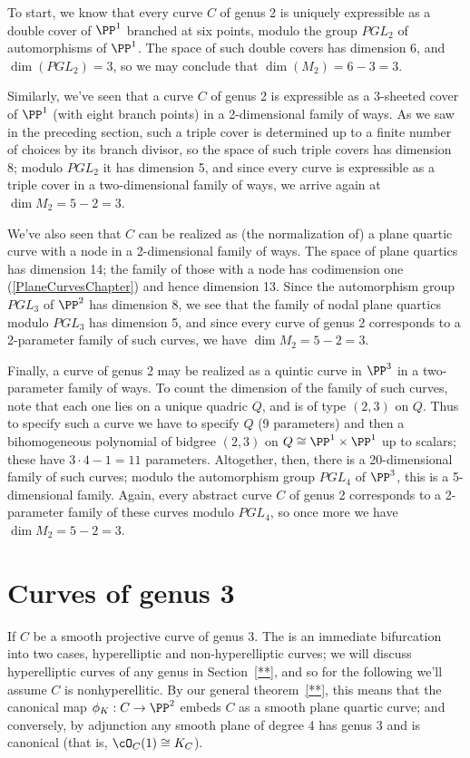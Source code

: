 To start, we know that every curve $C$ of genus 2 is uniquely expressible as a double cover of $\PP^1$ branched at six points, modulo the group $PGL_2$ of automorphisms of $\PP^1$. The space of such double covers has dimension 6, and $\dim(PGL_2) = 3$, so we may conclude that $\dim(M_2) = 6-3 = 3$.

Similarly, we've seen that a curve $C$ of genus 2 is expressible as a 3-sheeted cover of $\PP^1$ (with eight branch points) in a 2-dimensional family of ways. As we saw in the preceding section, such a triple cover is determined up to a finite number of choices by its branch divisor, so the space of such triple covers has dimension 8; modulo $PGL_2$ it has dimension 5, and since every curve is expressible as a triple cover in a two-dimensional family of ways, we arrive again at $\dim M_2 = 5-2 = 3$.

We've also seen that $C$ can be realized as (the normalization of) a plane quartic curve with a node in a 2-dimensional family of ways. The space of plane quartics has dimension 14; the family of those with a node has codimension one (\ref{PlaneCurvesChapter}) and hence dimension 13. Since  the automorphism group $PGL_3$ of $\PP^2$ has dimension 8, we see that the family of nodal plane quartics modulo $PGL_3$ has dimension 5, and since every curve of genus 2 corresponds to a 2-parameter family of such curves, we have $\dim M_2 = 5-2=3$.

Finally, a curve of genus 2 may be realized as a quintic curve in $\PP^3$ in a two-parameter family of ways. To count the dimension of the family of such curves, note that each one lies on a unique quadric $Q$, and is of type $(2,3)$ on $Q$. Thus to specify such a curve we have to specify $Q$ (9 parameters) and then a bihomogeneous polynomial of bidgree $(2,3)$ on $Q \cong \PP^1 \times \PP^1$ up to scalars; these have $3\cdot 4 - 1 = 11$ parameters. Altogether, then, there is a 20-dimensional family of such curves; modulo the automorphism group $PGL_4$ of $\PP^3$, this is a 5-dimensional family. Again, every abstract curve $C$ of genus 2 corresponds to a 2-parameter family of these curves modulo $PGL_4$, so once more we have $\dim M_2 = 5 - 2 = 3$.

\section{Curves of genus 3}

If $C$ be a smooth projective curve of genus 3. The is an immediate bifurcation into two cases, hyperelliptic and non-hyperelliptic curves; we will discuss hyperelliptic curves of any genus in Section~\ref{**}, and so for the following we'll assume $C$ is nonhyperellitic. By our general theorem~\ref{**}, this means that the canonical map $\phi_K : C \to \PP^2$ embeds $C$ as a smooth plane quartic curve; and conversely, by adjunction any smooth plane of degree 4 has genus 3 and is canonical (that is, $\cO_C(1) \cong K_C$). 

